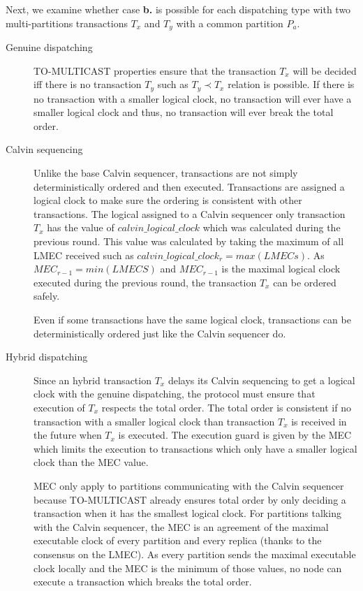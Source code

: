 \documentclass[a4paper, 10pt]{article}
\begin{document}
Next, we examine whether case \textbf{b.} is possible for each dispatching type with two multi-partitions
transactions $T_x$ and $T_y$ with a common partition $P_a$.

\begin{description}
    \item[Genuine dispatching] TO-MULTICAST properties ensure that the transaction $T_x$ will be decided
        iff there is no transaction $T_y$ such as $T_y \prec T_x$ relation is possible. If there is no
        transaction with a smaller logical clock, no transaction will ever have a smaller
        logical clock and thus, no transaction will ever break the total order.

    \item[Calvin sequencing] Unlike the base Calvin sequencer, transactions are not simply deterministically
        ordered and then executed. Transactions are assigned a logical clock to make sure the ordering is
        consistent with other transactions. The logical assigned to a Calvin sequencer only transaction $T_x$
        has the value of $calvin\_logical\_clock$ which was calculated during the previous round. This value was
        calculated by taking the maximum of all LMEC received such as $calvin\_logical\_clock_{r}=max(LMECs)$.
        As $MEC_{r-1} = min(LMECS)$ and $MEC_{r-1}$ is the maximal logical clock executed during the previous round,
        the transaction $T_x$ can be ordered safely.

        Even if some transactions have the same logical clock, transactions can be deterministically
        ordered just like the Calvin sequencer do.

    \item[Hybrid dispatching] Since an hybrid transaction $T_x$ delays its Calvin sequencing to get a
        logical clock with the genuine dispatching, the protocol must ensure that execution of $T_x$
        respects the total order. The total order is consistent if no transaction with a smaller logical clock
        than transaction $T_x$ is received in the future when $T_x$ is executed.
        The execution guard is given by the MEC which limits the execution
        to transactions which only have a smaller logical clock than the MEC value.

        MEC only apply to partitions communicating with the Calvin sequencer because TO-MULTICAST already ensures
        total order by only deciding a transaction when it has the smallest logical clock. For partitions talking with the Calvin
        sequencer, the MEC is an agreement of the maximal executable clock of every partition and every replica
        (thanks to the consensus on the LMEC). As every partition sends the maximal executable clock locally and
        the MEC is the minimum of those values, no node can execute a transaction which breaks the total order.
\end{description}
\end{document}
